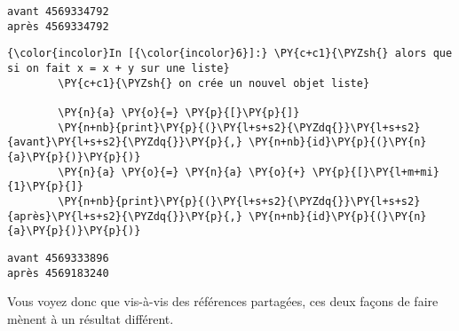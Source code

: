     \begin{Verbatim}[commandchars=\\\{\}]
avant 4569334792
après 4569334792

    \end{Verbatim}

    \begin{Verbatim}[commandchars=\\\{\}]
{\color{incolor}In [{\color{incolor}6}]:} \PY{c+c1}{\PYZsh{} alors que si on fait x = x + y sur une liste}
        \PY{c+c1}{\PYZsh{} on crée un nouvel objet liste}
        
        \PY{n}{a} \PY{o}{=} \PY{p}{[}\PY{p}{]}
        \PY{n+nb}{print}\PY{p}{(}\PY{l+s+s2}{\PYZdq{}}\PY{l+s+s2}{avant}\PY{l+s+s2}{\PYZdq{}}\PY{p}{,} \PY{n+nb}{id}\PY{p}{(}\PY{n}{a}\PY{p}{)}\PY{p}{)}
        \PY{n}{a} \PY{o}{=} \PY{n}{a} \PY{o}{+} \PY{p}{[}\PY{l+m+mi}{1}\PY{p}{]}
        \PY{n+nb}{print}\PY{p}{(}\PY{l+s+s2}{\PYZdq{}}\PY{l+s+s2}{après}\PY{l+s+s2}{\PYZdq{}}\PY{p}{,} \PY{n+nb}{id}\PY{p}{(}\PY{n}{a}\PY{p}{)}\PY{p}{)}
\end{Verbatim}


    \begin{Verbatim}[commandchars=\\\{\}]
avant 4569333896
après 4569183240

    \end{Verbatim}

    Vous voyez donc que vis-à-vis des références partagées, ces deux façons
de faire mènent à un résultat différent.


    
    
    
